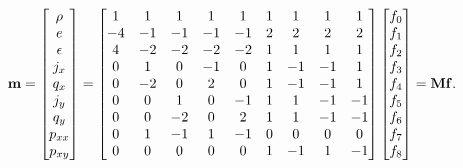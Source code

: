 \begin{equation} \label{eq:transformation-matrix}
\mathbf{m} = \begin{bmatrix}
\rho \\ e \\ \epsilon \\ j_x \\ q_x \\ j_y \\ q_y \\ p_{xx} \\ p_{xy}
\end{bmatrix} = \begin{bmatrix}
1 & 1 & 1 & 1 & 1 & 1 & 1 & 1 & 1 \\
-4 & -1 & -1 & -1 & -1 & 2 & 2 & 2 & 2 \\
4 & -2 & -2 & -2 & -2 & 1 & 1 & 1 & 1 \\
0 & 1 & 0 & -1 & 0 & 1 & -1 & -1 & 1 \\
0 & -2 & 0 & 2 & 0 & 1 & -1 & -1 & 1 \\
0 & 0 & 1 & 0 & -1 & 1 & 1 & -1 & -1 \\
0 & 0 & -2 & 0 & 2 & 1 & 1 & -1 & -1 \\
0 & 1 & -1 & 1 & -1 & 0 & 0 & 0 & 0 \\
0 & 0 & 0 & 0 & 0 & 1 & -1 & 1 & -1
\end{bmatrix} \begin{bmatrix}
f_0 \\
f_1 \\
f_2 \\
f_3 \\
f_4 \\
f_5 \\
f_6 \\
f_7 \\
f_8
\end{bmatrix} = \mathbf{M} \mathbf{f}.
\end{equation}

